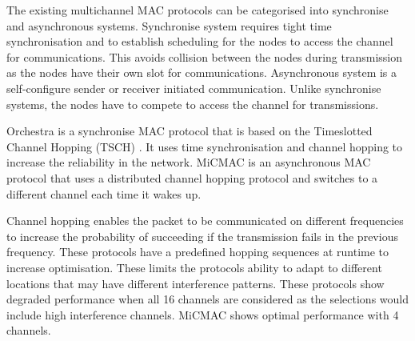 
The existing multichannel MAC protocols can be categorised into synchronise and asynchronous systems. Synchronise system requires tight time synchronisation and to establish scheduling for the nodes to access the channel for communications. This avoids collision between the nodes during transmission as the nodes have their own slot for communications. Asynchronous system is a self-configure sender or receiver initiated communication. Unlike synchronise systems, the nodes have to compete to access the channel for transmissions. 

Orchestra \cite{orchestra} is a synchronise MAC protocol
that is based on the Timeslotted Channel Hopping (TSCH) \cite{tsch}. It uses time synchronisation and channel hopping to increase the reliability in the network. 
MiCMAC \cite{micmac} is an asynchronous MAC protocol that uses a distributed channel hopping protocol and switches to a different channel each time it wakes up.

Channel hopping enables the packet to be communicated on different frequencies to increase the probability of succeeding if the transmission fails in the previous frequency. 
These protocols have a predefined hopping sequences at runtime to increase optimisation. These limits the protocols ability to adapt to different locations that may have different interference patterns. These protocols show degraded performance when all 16 channels are considered as the selections would include high interference channels. MiCMAC shows optimal performance with 4 channels. 



